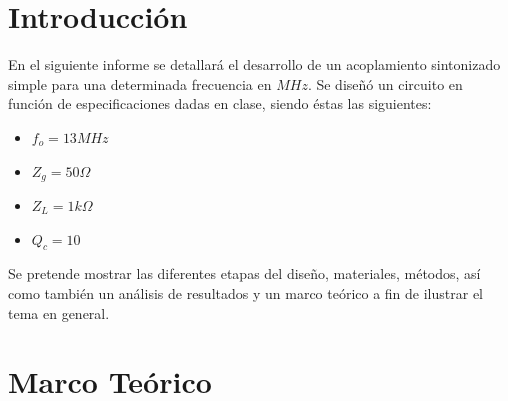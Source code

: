 \documentclass{article}
\begin{document}
\begin{titlepage}
    
\end{titlepage}


\pagestyle{fancy}
\fancyhf{}
\fancyhead[L]{\leftmark} %
\renewcommand{\headrulewidth}{0.4pt} %
\fancyfoot[R]{\thepage} %
\renewcommand{\footrulewidth}{0.4pt} %

\thispagestyle{empty}
\tableofcontents
\newpage
\thispagestyle{empty}
\listoffigures
\newpage
\thispagestyle{empty}
\listoftables

\newpage
\thispagestyle{empty}
\section{Introducción}
En el siguiente informe se detallará el desarrollo de un acoplamiento sintonizado simple para una determinada frecuencia en $MHz$. Se diseñó un circuito en función de especificaciones dadas en clase, siendo éstas las siguientes:
\begin{itemize}
    \item $f_o=13 MHz$
	\item $Z_g=50 \Omega$
	\item $Z_L=1 k\Omega$
	\item $Q_c=10$
\end{itemize}
\noindent Se pretende mostrar las diferentes etapas del diseño, materiales, métodos, así como también un análisis de resultados y un marco teórico a fin de ilustrar el tema en general.

\newpage
\section{Marco Teórico}
\end{document}
